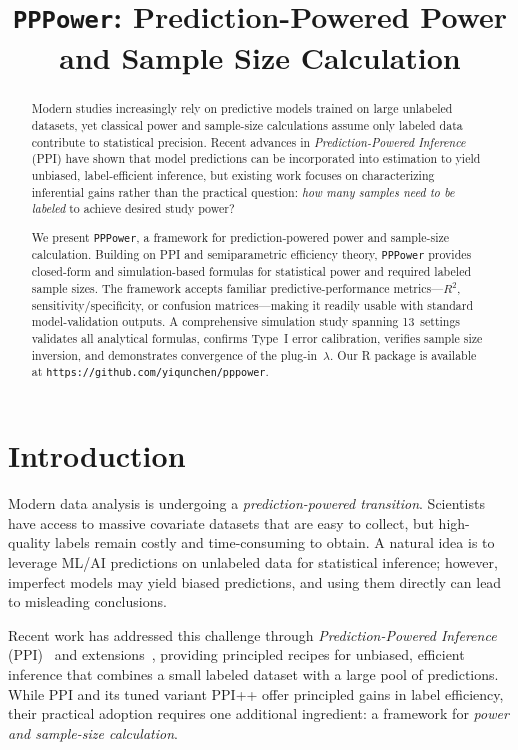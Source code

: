 \documentclass[11pt]{article}
\title{\texttt{PPPower}: Prediction-Powered Power and Sample Size Calculation}
\author{}
\date{}
\begin{document}
\maketitle

\begin{abstract}
Modern studies increasingly rely on predictive models trained on large
unlabeled datasets, yet classical power and sample-size calculations
assume only labeled data contribute to statistical precision.  Recent
advances in \emph{Prediction-Powered Inference} (PPI) have shown that
model predictions can be incorporated into estimation to yield unbiased,
label-efficient inference, but existing work focuses on characterizing
inferential gains rather than the practical question: \emph{how many
samples need to be labeled} to achieve desired study power?

We present \texttt{PPPower}, a framework for prediction-powered power
and sample-size calculation.  Building on PPI and semiparametric
efficiency theory, \texttt{PPPower} provides closed-form and
simulation-based formulas for statistical power and required labeled
sample sizes.  The framework accepts familiar predictive-performance
metrics---$R^2$, sensitivity/specificity, or confusion matrices---making
it readily usable with standard model-validation outputs.  A
comprehensive simulation study spanning 13~settings validates all
analytical formulas, confirms Type~I error calibration, verifies sample
size inversion, and demonstrates convergence of the plug-in~$\lambda$.
Our R package is available at
\texttt{https://github.com/yiqunchen/pppower}.
\end{abstract}

\section{Introduction}
\label{sec:intro}

Modern data analysis is undergoing a \emph{prediction-powered
transition}.  Scientists have access to massive covariate datasets that
are easy to collect, but high-quality labels remain costly and
time-consuming to obtain.  A natural idea is to leverage ML/AI
predictions on unlabeled data for statistical inference; however,
imperfect models may yield biased predictions, and using them directly
can lead to misleading conclusions.

Recent work has addressed this challenge through \emph{Prediction-Powered
Inference} (PPI)~\citep{angelopoulos2023prediction} and
extensions~\citep{miao2025assumption,wang2020methods,zrnic2024cross},
providing principled recipes for unbiased, efficient inference that
combines a small labeled dataset with a large pool of predictions.
While PPI and its tuned variant PPI++ offer principled gains in label
efficiency, their practical adoption requires one additional ingredient:
a framework for \emph{power and sample-size calculation}.
\end{document}
